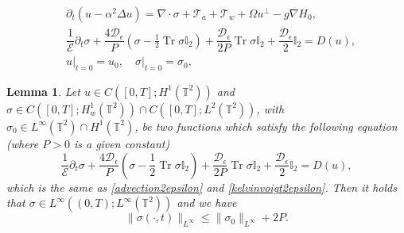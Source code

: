 \documentclass[10pt,a4paper]{amsart}
\newtheorem{lemma}{Lemma}
\DeclareMathOperator{\Tr}{Tr}
\begin{document}
\begin{align}
&\partial_t (u - \alpha^2 \Delta u) = \nabla \cdot \sigma + \mathcal{T}_a + \mathcal{T}_w + \Omega u^\perp - g \nabla H_0, \label{kelvinvoigt1epsilon} \\
&\dfrac{1}{\mathcal E} \partial_t \sigma + \dfrac{4 \mathcal{D}_\epsilon}{P} (\sigma - \frac{1}{2} \Tr \sigma \mathbb I_2) + \dfrac{\mathcal{D}_\epsilon}{2P} \Tr \sigma \mathbb I_2 + \dfrac{\mathcal{D}_\epsilon}{2} \mathbb I_2  = D(u), \label{kelvinvoigt2epsilon}
	\\
&u \lvert_{t = 0} = u_0, \quad \sigma \lvert_{t = 0} = \sigma_0, \label{kelvinvoigt3epsilon}
\end{align}

\begin{lemma} \label{Lpestimatelemma}
Let $u \in C([0,T];H^1 (\mathbb{T}^2))$ and $\sigma \in C([0,T];H^1_w (\mathbb{T}^2)) \cap C([0,T]; L^2 (\mathbb{T}^2))$, with $\sigma_0 \in L^\infty (\mathbb{T}^2) \cap H^1 (\mathbb{T}^2)$, be two functions which satisfy the following equation (where $P > 0$ is a given constant)
\begin{equation}
\dfrac{1}{\mathcal E} \partial_t \sigma + \dfrac{4 \mathcal{D}_\epsilon}{P} (\sigma - \frac{1}{2} \Tr \sigma \mathbb I_2) + \dfrac{\mathcal{D}_\epsilon}{2P} \Tr \sigma \mathbb I_2 + \dfrac{\mathcal{D}_\epsilon}{2} \mathbb I_2  = D(u),
\end{equation}
which is the same as \eqref{advection2epsilon} and \eqref{kelvinvoigt2epsilon}. Then it holds that $\sigma \in L^\infty ((0,T); L^\infty (\mathbb{T}^2))$ and we have
\begin{equation}
\lVert \sigma (\cdot, t) \rVert_{L^\infty} \leq \lVert \sigma_0 \rVert_{L^\infty} + 2 P.
\end{equation}
\end{lemma}
\end{document}
